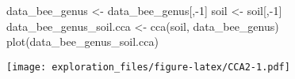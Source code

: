 \documentclass[
]{article}
\newenvironment{Shaded}{\begin{snugshade}}{\end{snugshade}}
\newcommand{\DecValTok}[1]{\textcolor[rgb]{0.00,0.00,0.81}{#1}}
\newcommand{\FunctionTok}[1]{\textcolor[rgb]{0.00,0.00,0.00}{#1}}
\newcommand{\NormalTok}[1]{#1}
\newcommand{\OtherTok}[1]{\textcolor[rgb]{0.56,0.35,0.01}{#1}}
\newcommand{\SpecialCharTok}[1]{\textcolor[rgb]{0.00,0.00,0.00}{#1}}
\begin{document}
\begin{Shaded}
\begin{Highlighting}[]
\NormalTok{data\_bee\_genus }\OtherTok{\textless{}{-}}\NormalTok{ data\_bee\_genus[,}\SpecialCharTok{{-}}\DecValTok{1}\NormalTok{]}
\NormalTok{soil }\OtherTok{\textless{}{-}}\NormalTok{ soil[,}\SpecialCharTok{{-}}\DecValTok{1}\NormalTok{]}
\NormalTok{data\_bee\_genus\_soil.cca }\OtherTok{\textless{}{-}} \FunctionTok{cca}\NormalTok{(soil, data\_bee\_genus)}
\FunctionTok{plot}\NormalTok{(data\_bee\_genus\_soil.cca)}
\end{Highlighting}
\end{Shaded}

\texttt{[image: exploration\_files/figure-latex/CCA2-1.pdf]}

\begin{Shaded}
\end{Shaded}
\end{document}
